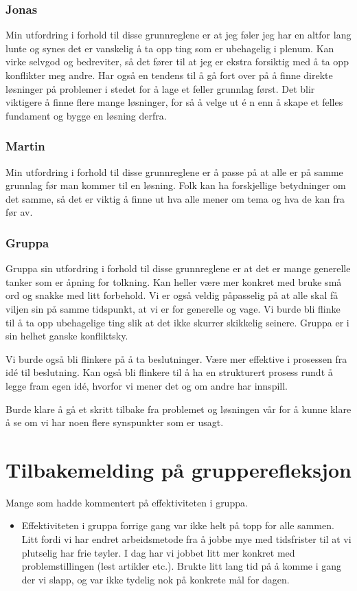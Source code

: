 \documentclass[5p]{elsarticle}
\begin{document}
\subsubsection*{Jonas}
Min utfordring i forhold til disse grunnreglene er at jeg føler jeg har en altfor lang lunte og synes det er vanskelig å ta opp ting som er ubehagelig i plenum. Kan virke selvgod og bedreviter, så det fører til at jeg er ekstra forsiktig med å ta opp konflikter meg andre. Har også en tendens til å gå fort over på å finne direkte løsninger på problemer i stedet for å lage et feller grunnlag først. Det blir viktigere å finne flere mange løsninger, for så å velge ut \'e n enn å skape et felles fundament og bygge en løsning derfra.

\subsubsection*{Martin}
Min utfordring i forhold til disse grunnreglene er å passe på at alle er på samme grunnlag før man kommer til en løsning. Folk kan ha forskjellige betydninger om det samme, så det er viktig å finne ut hva alle mener om tema og hva de kan fra før av.

\subsubsection*{Gruppa}
Gruppa sin utfordring i forhold til disse grunnreglene er at det er mange generelle tanker som er åpning for tolkning. Kan heller være mer konkret med bruke små ord og snakke med litt forbehold. Vi er også veldig påpasselig på at alle skal få viljen sin på samme tidspunkt, at vi er for generelle og vage. Vi burde bli flinke til å ta opp ubehagelige ting slik at det ikke skurrer skikkelig seinere. Gruppa er i sin helhet ganske konfliktsky.

Vi burde også bli flinkere på å ta beslutninger. Være mer effektive i prosessen fra id\'e til beslutning. Kan også bli flinkere til å ha en strukturert prosess rundt å legge fram egen id\'e, hvorfor vi mener det og om andre har innspill.

Burde klare å gå et skritt tilbake fra problemet og løsningen vår for å kunne klare å se om vi har noen flere synspunkter som er usagt.


\section*{Tilbakemelding på grupperefleksjon}
Mange som hadde kommentert på effektiviteten i gruppa.
\begin{itemize}
\item Effektiviteten i gruppa forrige gang var ikke helt på topp for alle sammen. Litt fordi vi har endret arbeidsmetode fra å jobbe mye med tidsfrister til at vi plutselig har frie tøyler. I dag har vi jobbet litt mer konkret med problemstillingen (lest artikler etc.). Brukte litt lang tid på å komme i gang der vi slapp, og var ikke tydelig nok på konkrete mål for dagen.
\end{itemize}
\end{document}
